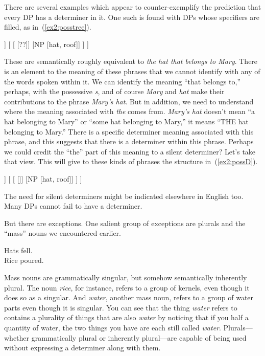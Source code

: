 There are several examples which appear to counter-exemplify the prediction that every DP has a determiner in it. One such is found with DPs whose specifiers are filled, as in~(\ref{ex2:posstree}). 
\begin{exe}
	\ex \label{ex2:posstree}
	\small
\begin{forest}
[DP
	[DP's [Mary, roof]]
	[ 
		[ [??]]
		[NP [hat, roof]]
	 ]
]
\end{forest}
\end{exe}
These are semantically roughly equivalent to \emph{the hat that belongs to Mary}. There is an element to the meaning of these phrases that we cannot identify with any of the words spoken within it. We can identify the meaning ``that belongs to,'' perhaps, with the possessive \emph{s}, and of course \emph{Mary} and \emph{hat} make their contributions to the phrase \emph{Mary's hat}. But in addition, we need to understand where the meaning associated with \emph{the} comes from. \emph{Mary's hat} doesn't mean ``a hat belonging to Mary'' or ``some hat belonging to Mary,'' it means ``THE hat belonging to Mary.'' There is a specific determiner meaning associated with this phrase, and this suggests that there is a determiner within this phrase. Perhaps we could credit the ``the'' part  of this meaning to a silent determiner? Let's take that view. This will give to these kinds of phrases the structure in~(\ref{ex2:possD}).
\begin{exe}
	\raggedright
	\ex \label{ex2:possD} 
	\small
\begin{forest}
[DP
	[DP's [Mary, roof]]
	[
		[ []]
		[NP [hat, roof]]
	]
]
\end{forest}
\end{exe}

The need for silent determiners might be indicated elsewhere in English too. Many DPs cannot fail to have a determiner.
\begin{exe}
\end{exe}
But there are exceptions. One salient group of exceptions are plurals and the ``mass'' nouns we encountered earlier.
\begin{exe}
	\ex \label{ex2:detopt} Hats fell.\\ Rice poured.
\end{exe}
Mass nouns are grammatically singular, but somehow semantically inherently plural. The noun \emph{rice}, for instance, refers to a group of kernels, even though it does so as a singular. And \emph{water}, another mass noun, refers to a group of water parts even though it is singular. You can see that the thing \emph{water} refers to contains a plurality of things that are also \emph{water} by noticing that if you half a quantity of water, the two things you have are each still called \emph{water}. Plurals---whether grammatically plural or inherently plural---are capable of being used without expressing a determiner along with them. 

